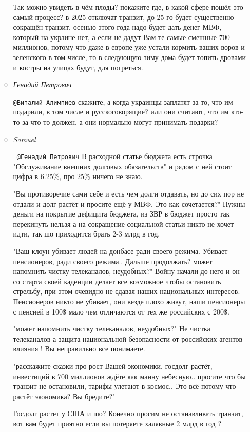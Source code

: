 \begin{itemize}
\begin{itemize}
Так можно увидеть в чём плоды? покажите где, в какой сфере пошёл это самый
процесс? в 2025 отключат транзит, до 25-го будет существенно сокращён транзит,
осенью этого года надо будет дать денег МВФ, который на украине нет, а если не
дадут Вам те самые смешные 700 миллионов, потому что даже в европе уже устали
кормить ваших воров и зеленского в том числе, то в следующую зиму дома будет
топить дровами и костры на улицах будут, для погреться.

\item \emph{Генадий Петрович}

\verb|@Виталий Алимпиев|  скажите, а когда украинцы заплатят за то, что им подарили,
в том числе и русскоговорящие? или они считают, что им кто-то за что-то
должен, а они нормально могут принимать подарки?

\item \emph{Samuel}

\verb| @Генадий Петрович|  В расходной статье бюджета есть строчка
"Обслуживание внешних долговых обязательств" и рядом с ней стоит цифра в 6.25\%,
про 25\% ничего не знаю. 

"Вы противоречие сами себе и есть чем долги отдавать, но до сих пор не отдали и
долг растёт и просите ещё у МВФ. Это как сочетается?" Нужны деньги на покрытие
дефицита бюджета, из ЗВР в бюджет просто так перекинуть нельзя а на сокращение
социальной статьи никто не хочет идти, так шо приходится брать 2-3 млрд в год.

"Ваш клоун убивает людей на донбасе ради своего режима. Убивает пенсионеров,
ради своего режима.. Дальше продолжать? может напомнить чистку телеканалов,
неудобных?" Войну начали до него и он со старта своей каденции делает все
возможное чтобы остановить стрельбу, при этом очевидно не сдавая наших
национальных интересов. Пенсионеров никто не убивает, они везде плохо живут,
наши пенсионеры с пенсией в 100\$ мало чем отличаются от тех же российских с
200\$. 

"может напомнить чистку телеканалов, неудобных?" Не чистка телеканалов а защита
национальной безопасности от российских агентов влияния ! Вы неправильно все
понимаете.

"расскажите сказки про рост Вашей экономики, госдолг растёт, инвестиций в 700
миллионов ждёте как манну небесную.. просите что бы транзит не остановили,
тарифы улетают в космос.. Это всё потому что растёт экономика? Вы бредите?" 

Госдолг растет у США и шо? Конечно просим не останавливать транзит, вот вам
будет приятно если вы потеряете халявные 2 млрд в год ? 


\end{itemize}
\end{itemize}
